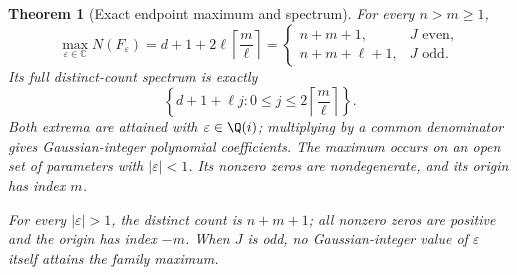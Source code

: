\documentclass[UTF8,11pt]{ctexart}
\newtheorem{thm}{Theorem}[section]
\theoremstyle{definition}
\numberwithin{equation}{section}
\newcommand{\C}{\mathbb C}\newcommand{\R}{\mathbb R}
\begin{document}
\begin{thm}[Exact endpoint maximum and spectrum]
\label{v10:thm:endpoint}
For every $n>m\ge1$,
\begin{equation}\label{v10:eq:maximum}
 \max_{\varepsilon\in\C}N(F_\varepsilon)
 =d+1+2\ell\left\lceil\frac m\ell\right\rceil
 =\begin{cases}
 n+m+1,&J\text{ even},\\
 n+m+\ell+1,&J\text{ odd}.
 \end{cases}
\end{equation}
Its full distinct-count spectrum is exactly
\begin{equation}\label{v10:eq:spectrum}
 \left\{d+1+\ell j:
 0\le j\le2\left\lceil\frac m\ell\right\rceil\right\}.
\end{equation}
Both extrema are attained with $\varepsilon\in\Q(i)$; multiplying
by a common denominator gives Gaussian-integer polynomial coefficients.
The maximum occurs on an open set of parameters with
$|\varepsilon|<1$. Its nonzero zeros are nondegenerate, and its
origin has index $m$.

For every $|\varepsilon|>1$, the distinct count is $n+m+1$;
all nonzero zeros are positive and the origin has index $-m$.
When $J$ is odd, no Gaussian-integer value of $\varepsilon$ itself
attains the family maximum.
\end{thm}
\end{document}
